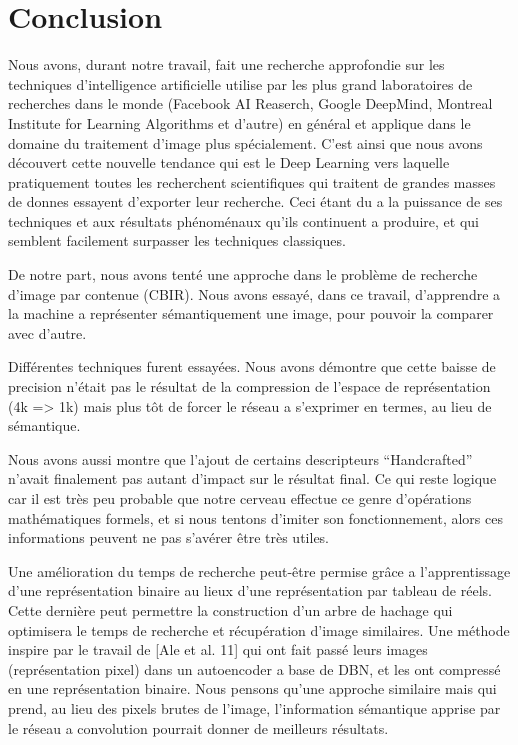
\chapter*{Conclusion} %

Nous avons, durant notre travail, fait une recherche approfondie sur les techniques d'intelligence artificielle utilise par les plus grand laboratoires de recherches dans le monde (Facebook AI Reaserch, Google DeepMind, Montreal Institute for Learning Algorithms et d'autre) en général et applique dans le domaine du traitement d'image plus spécialement. C'est ainsi que nous avons découvert cette nouvelle tendance qui est le Deep Learning vers laquelle pratiquement toutes les recherchent scientifiques qui traitent de grandes masses de donnes essayent d'exporter leur recherche. Ceci étant du a la puissance de ses techniques et aux résultats phénoménaux qu'ils continuent a produire, et qui semblent facilement surpasser les techniques classiques.

De notre part, nous avons tenté une approche dans le problème de recherche d'image par contenue (CBIR). Nous avons essayé, dans ce travail, d'apprendre a la machine a représenter sémantiquement une image, pour pouvoir la comparer avec d'autre.

Différentes techniques furent essayées. Nous avons démontre que cette baisse de precision n’était pas le résultat de la compression de l'espace de représentation (4k => 1k)  mais plus tôt de forcer le réseau a s'exprimer en termes, au lieu de sémantique.

Nous avons aussi montre que l'ajout de certains descripteurs “Handcrafted” n'avait finalement pas autant d'impact sur le résultat final. Ce qui reste logique car il est très peu probable que notre cerveau effectue ce genre d’opérations mathématiques formels, et si nous tentons d'imiter son fonctionnement, alors ces informations peuvent ne pas s’avérer être très utiles.

Une amélioration du temps de recherche peut-être permise grâce a l'apprentissage d'une représentation binaire au lieux d'une représentation par tableau de réels. Cette dernière peut permettre la construction d'un arbre de hachage qui optimisera le temps de recherche et récupération d'image similaires. Une méthode inspire par le travail de [Ale et al. 11] qui ont fait passé leurs images (représentation pixel) dans un autoencoder a base de DBN, et les ont compressé en une représentation binaire. Nous pensons qu'une approche similaire mais qui prend, au lieu des pixels brutes de l'image, l'information sémantique apprise par le réseau a convolution pourrait donner de meilleurs résultats. 

